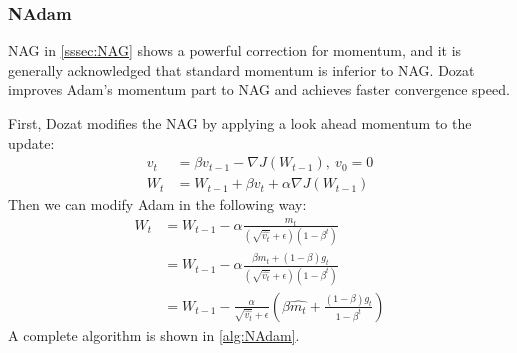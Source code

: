 \subsubsection{NAdam}
NAG in \autoref{sssec:NAG} shows a powerful correction for momentum,  and it is 
generally acknowledged that standard momentum is inferior to NAG. Dozat 
\parencite{dozat2016incorporating} improves Adam's momentum part to NAG and 
achieves faster convergence speed.
\par First, Dozat modifies the NAG by applying a look ahead momentum to the update:
\begin{equation}
    \begin{split}
        v_t & = \beta v_{t-1} - \nabla J(W_{t-1}),\ v_0 = 0 \\
        W_t & = W_{t-1} +  \beta v_t + \alpha \nabla J(W_{t-1})
    \end{split}
\end{equation} 
Then we can modify Adam in the following way:
\begin{equation}
    \begin{split}
        W_t & = W_{t-1} - \alpha \frac{m_t}{(\sqrt{\hat{v_t}} + \epsilon)(1-\beta^t)} \\
        & = W_{t-1} - \alpha \frac{\beta m_t + (1-\beta)g_t}{(\sqrt{\hat{v_t}} + \epsilon)(1-\beta^t)} \\
        & = W_{t-1} - \frac{\alpha}{\sqrt{\hat{v_t}} + \epsilon}(\beta \hat{m_t} + \frac{(1-\beta)g_t}{1-\beta^t})
    \end{split}
\end{equation}
A complete algorithm is shown in \autoref{alg:NAdam}.

